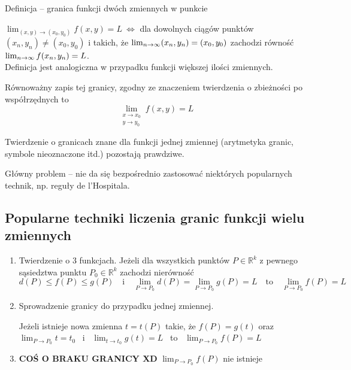 \begin{tw}{Definicja -- granica funkcji dwóch zmiennych w punkcie}

$ \lim_{(x,y) \to (x_0,y_0)} f(x,y) = L \ \Leftrightarrow $ dla dowolnych ciągów punktów $ (x_n, y_n) \neq (x_0, y_0) $
i takich, że $ \lim_{n \to \infty} (x_n, y_n) = (x_0, y_0) $ zachodzi równość $ \lim_{n \to \infty} f(x_n, y_n) = L $. \\

Definicja jest analogiczna w przypadku funkcji większej ilości zmiennych.

Równoważny zapis tej granicy, zgodny ze znaczeniem twierdzenia o zbieżności po współrzędnych to
$$ \lim_{\substack{x \to x_0 \\ y \to y_0}} f(x,y) = L $$

Twierdzenie o granicach znane dla funkcji jednej zmiennej (arytmetyka granic, symbole nieoznaczone itd.) pozostają prawdziwe.
\end{tw}

Główny problem -- nie da się bezpośrednio zastosować niektórych popularnych technik, np. reguły de l'Hospitala.

\subsection*{Popularne techniki liczenia granic funkcji wielu zmiennych}

\begin{enumerate}
    \item Twierdzenie o 3 funkcjach. Jeżeli dla wszystkich punktów $ P \in \mathbb{R}^k $ z pewnego sąsiedztwa punktu
    $ P_0 \in \mathbb{R}^k $ zachodzi nierówność 
    $$ d(P) \leq f(P) \leq g(P) \quad \textrm{i} \quad \lim_{P \to P_0} d(P) = \lim_{P \to P_0} g(P) = L \quad \textrm{to} \quad \lim_{P \to P_0} f(P) = L $$

    \item Sprowadzenie granicy do przypadku jednej zmiennej.
    
    Jeżeli istnieje nowa zmienna $ t = t(P) $ takie, że $ f(P) = g(t) $ oraz 
    $ \lim_{P \to P_0} t = t_0 $ \ i \linebreak \ $ \lim_{t \to t_0} g(t) = L $ \ to \ $ \lim_{P \to P_0} f(P) = L $ 

    \item \textbf{COŚ O BRAKU GRANICY XD}
    $ \lim_{P \to P_0} f(P) $ nie istnieje
\end{enumerate}


